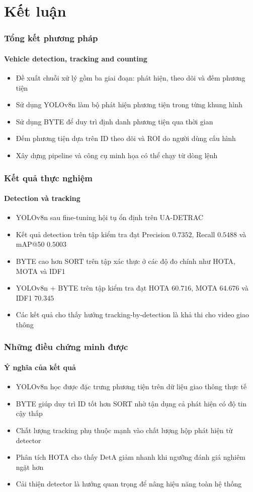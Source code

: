 \section{Kết luận}

\begin{frame}
\frametitle{Tổng kết phương pháp}
\framesubtitle{Vehicle detection, tracking and counting}

\begin{itemize}[<+->]
  \item Đề xuất chuỗi xử lý gồm ba giai đoạn: phát hiện, theo dõi và đếm
        phương tiện
  \item Sử dụng YOLOv8n làm bộ phát hiện phương tiện trong từng khung hình
  \item Sử dụng BYTE để duy trì định danh phương tiện qua thời gian
  \item Đếm phương tiện dựa trên ID theo dõi và ROI do người dùng cấu hình
  \item Xây dựng pipeline và công cụ minh họa có thể chạy từ dòng lệnh
\end{itemize}

\end{frame}

\begin{frame}
\frametitle{Kết quả thực nghiệm}
\framesubtitle{Detection và tracking}

\begin{itemize}[<+->]
  \item YOLOv8n sau fine-tuning hội tụ ổn định trên UA-DETRAC
  \item Kết quả detection trên tập kiểm tra đạt Precision $0.7352$,
        Recall $0.5488$ và mAP@50 $0.5003$
  \item BYTE cao hơn SORT trên tập xác thực ở các độ đo chính như HOTA, MOTA
        và IDF1
  \item YOLOv8n + BYTE trên tập kiểm tra đạt HOTA $60.716$, MOTA $64.676$ và
        IDF1 $70.345$
  \item Các kết quả cho thấy hướng tracking-by-detection là khả thi cho video
        giao thông
\end{itemize}

\end{frame}

\begin{frame}
\frametitle{Những điều chứng minh được}
\framesubtitle{Ý nghĩa của kết quả}

\begin{itemize}[<+->]
  \item YOLOv8n học được đặc trưng phương tiện trên dữ liệu giao thông thực tế
  \item BYTE giúp duy trì ID tốt hơn SORT nhờ tận dụng cả phát hiện có độ tin
        cậy thấp
  \item Chất lượng tracking phụ thuộc mạnh vào chất lượng hộp phát hiện từ
        detector
  \item Phân tích HOTA cho thấy DetA giảm nhanh khi ngưỡng đánh giá nghiêm
        ngặt hơn
  \item Cải thiện detector là hướng quan trọng để nâng hiệu năng toàn hệ thống
\end{itemize}

\end{frame}

